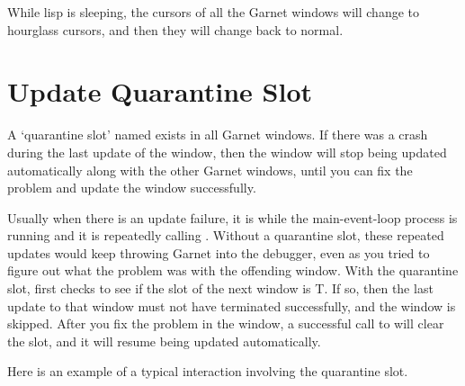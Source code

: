 While lisp is sleeping, the cursors of all the Garnet windows will change
to hourglass cursors, and then they will change back to normal.



\section{Update Quarantine Slot}
\label{quarantine-slot}
 

A `quarantine slot' named  exists in all Garnet windows.
If there was a crash during the last update of the window, then the window
will stop being updated automatically along with the other Garnet windows,
until you can fix the problem and update the window successfully.

Usually when there is an update failure, it is while the main-event-loop
process is running and it is repeatedly calling .
Without a quarantine slot, these repeated updates
would keep throwing Garnet into the debugger, even as you tried to figure
out what the problem was with the offending window.  With the quarantine slot,
 first checks to see if the  slot of
the next window is T.  If so, then the last update to that window must not
have terminated successfully, and the window is skipped.  After you fix
the problem in the window, a successful call to  will clear
the slot, and it will resume being updated automatically.

Here is an example of a typical interaction involving the quarantine slot.

